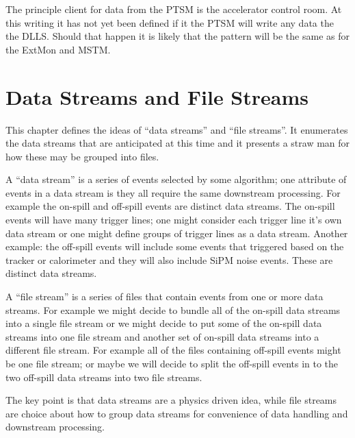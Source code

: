 The principle client for data from the PTSM is the accelerator control room.
At this writing it has not yet been defined if it the PTSM will write any data the the DLLS.
Should that happen it is likely that the pattern will be the same as for the ExtMon
and MSTM.


\chapter{Data Streams and File Streams}
\label{ch:DataStreamsAndFileStreams}

This chapter defines the ideas of ``data streams'' and ``file streams''.
It enumerates the data streams that are anticipated at this time
and it presents a straw man for how these may be grouped into files.


A ``data stream'' is a series of events selected by some algorithm;
one attribute of events in a data stream is they all require the same downstream processing.
For example the on-spill and off-spill events are distinct data streams.
The on-spill events will have many trigger lines; one might consider each trigger
line it's own data stream or one might define groups of trigger lines as a data stream.
Another example: the off-spill events will include some events that triggered based on
the tracker or calorimeter and they will also include SiPM noise events.
These are distinct data streams.

A ``file stream'' is a series of files that contain events from one or more data streams.
For example we might decide to bundle all of the on-spill data streams into a single
file stream or we might decide to put some of the on-spill data streams into one file
stream and another set of on-spill data streams into a different file stream.
For example all of the files containing off-spill events might be one file stream;
or maybe we will decide to split the off-spill events in to
the two off-spill data streams into two file streams.

The key point is that data streams are a physics driven idea,
while file streams are choice about how to group data streams for convenience of data handling and downstream processing.


